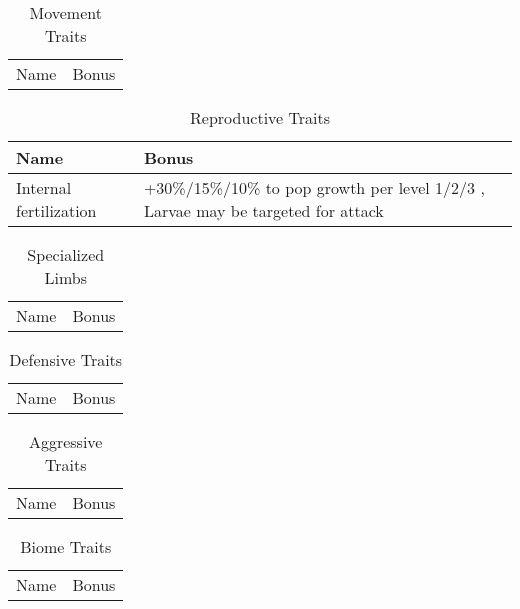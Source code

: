 \begin{table}[h]
		\begin{tabularx}{\linewidth}{|l|X|}
		\hline
		Name & Bonus\\
		\end{tabularx}
	\caption{Movement Traits}
	\label{tab:Movement}
\end{table}

\begin{table}[h]
		\begin{tabularx}{\linewidth}{|l|X|}
		\hline
		Name & Bonus\\
		\hline
		Internal fertilization & +30\%/15\%/10\% to pop growth per level 1/2/3 , Larvae may be targeted for attack\\
		\hline
		\end{tabularx}
	\caption{Reproductive Traits}
	\label{tab:ReproductiveTraits}
\end{table}

\begin{table}[h]
		\begin{tabularx}{\linewidth}{|l|X|}
		\hline
		Name & Bonus\\
		\end{tabularx}
	\caption{Specialized Limbs}
	\label{tab:SpecializedLimbs}
\end{table}

\begin{table}[h]
		\begin{tabularx}{\linewidth}{|l|X|}
		\hline
		Name & Bonus\\
		\end{tabularx}
	\caption{Defensive Traits}
	\label{tab:DefensiveTraits}
\end{table}

\begin{table}[h]
		\begin{tabularx}{\linewidth}{|l|X|}
		\hline
		Name & Bonus\\
		\end{tabularx}
	\caption{Aggressive Traits}
	\label{tab:AggressiveTraits}
\end{table}

\begin{table}[h]
		\begin{tabularx}{\linewidth}{|l|X|}
		\hline
		Name & Bonus\\
		\end{tabularx}
	\caption{Biome Traits}
	\label{tab:BiomeTraits}
\end{table}

